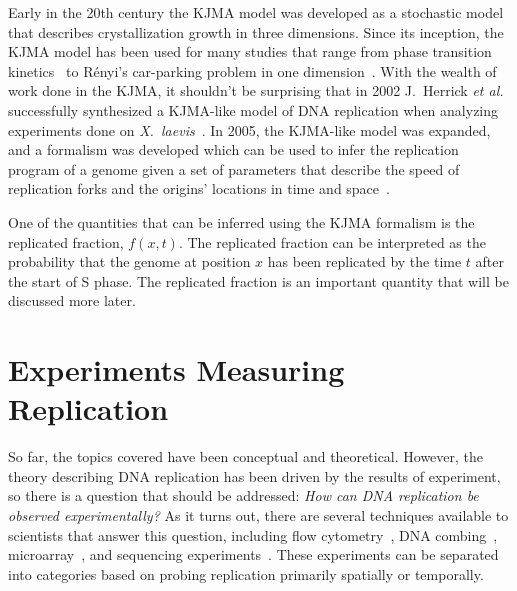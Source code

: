 	Early in the 20th century the KJMA model was developed as a stochastic model that describes crystallization growth in three dimensions\cite{Kolmogorov, JohnsonAndMehl, AvramiI, AvramiII, AvramiIII}.
	Since its inception, the KJMA model has been used for many studies that range from phase transition kinetics~\cite{AlloyPhaseTransitions} to R{\'e}nyi's car-parking problem in one dimension~\cite{CarParking}.
	With the wealth of work done in the KJMA, it shouldn't be surprising that in 2002 J.~Herrick \emph{et al.} successfully synthesized a KJMA-like model of DNA replication when analyzing experiments done on \emph{X.~laevis}~\cite{KJMA2002}.
	In 2005, the KJMA-like model was expanded, and a formalism was developed which can be used to infer the replication program of a genome given a set of parameters that describe the speed of replication forks and the origins' locations in time and space~\cite{KJMA1, KJMA2}.
	
	One of the quantities that can be inferred using the KJMA formalism is the replicated fraction, $f(x,t)$.
	The replicated fraction can be interpreted as the probability that the genome at position $x$ has been replicated by the time $t$ after the start of S phase.
	The replicated fraction is an important quantity that will be discussed more later.
	
	
	\section{Experiments Measuring Replication}
	\label{sec:Experiments}
	
	So far, the topics covered have been conceptual and theoretical.
	However, the theory describing DNA replication has been driven by the results of experiment, so there is a question that should be addressed:
	\emph{How can DNA replication be observed experimentally?}
	As it turns out, there are several techniques available to scientists that answer this question, including flow cytometry~\cite{DeepSeq}, DNA combing~\cite{DNACombing}, microarray~\cite{MicroarrayReview, McCuneMicroArray}, and sequencing experiments~\cite{DeepSeq,StochasticTermination}.
	These experiments can be separated into categories based on probing replication primarily spatially or temporally.
	
